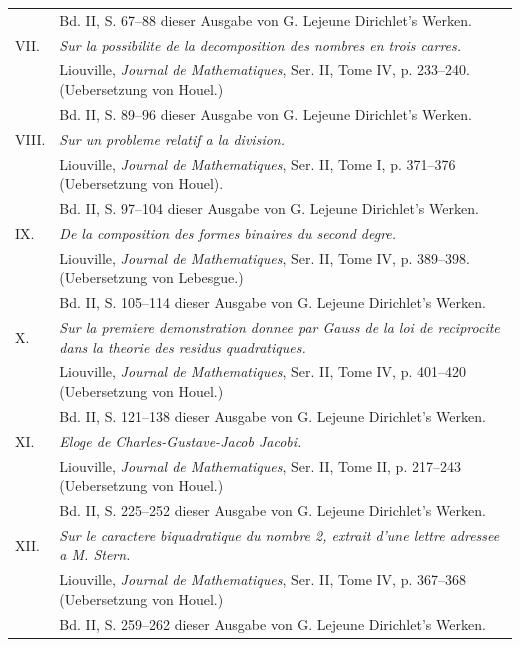 \documentclass[11pt]{article}
\begin{document}
\begin{longtable}{@{}p{}p{}@{}}
& Bd. II, S. 67--88 dieser Ausgabe von G. Lejeune Dirichlet's Werken.\\[0.45em]
VII. & \emph{Sur la possibilite de la decomposition des nombres en trois carres.}\\
& Liouville, \emph{Journal de Mathematiques}, Ser. II, Tome IV, p. 233--240. (Uebersetzung von Houel.)\\
& Bd. II, S. 89--96 dieser Ausgabe von G. Lejeune Dirichlet's Werken.\\[0.45em]
VIII. & \emph{Sur un probleme relatif a la division.}\\
& Liouville, \emph{Journal de Mathematiques}, Ser. II, Tome I, p. 371--376 (Uebersetzung von Houel).\\
& Bd. II, S. 97--104 dieser Ausgabe von G. Lejeune Dirichlet's Werken.\\[0.45em]
IX. & \emph{De la composition des formes binaires du second degre.}\\
& Liouville, \emph{Journal de Mathematiques}, Ser. II, Tome IV, p. 389--398. (Uebersetzung von Lebesgue.)\\
& Bd. II, S. 105--114 dieser Ausgabe von G. Lejeune Dirichlet's Werken.\\[0.45em]
X. & \emph{Sur la premiere demonstration donnee par Gauss de la loi de reciprocite dans la theorie des residus quadratiques.}\\
& Liouville, \emph{Journal de Mathematiques}, Ser. II, Tome IV, p. 401--420 (Uebersetzung von Houel.)\\
& Bd. II, S. 121--138 dieser Ausgabe von G. Lejeune Dirichlet's Werken.\\[0.45em]
XI. & \emph{Eloge de Charles-Gustave-Jacob Jacobi.}\\
& Liouville, \emph{Journal de Mathematiques}, Ser. II, Tome II, p. 217--243 (Uebersetzung von Houel.)\\
& Bd. II, S. 225--252 dieser Ausgabe von G. Lejeune Dirichlet's Werken.\\[0.45em]
XII. & \emph{Sur le caractere biquadratique du nombre 2, extrait d'une lettre adressee a M. Stern.}\\
& Liouville, \emph{Journal de Mathematiques}, Ser. II, Tome IV, p. 367--368 (Uebersetzung von Houel.)\\
& Bd. II, S. 259--262 dieser Ausgabe von G. Lejeune Dirichlet's Werken.
\end{longtable}
\end{document}
